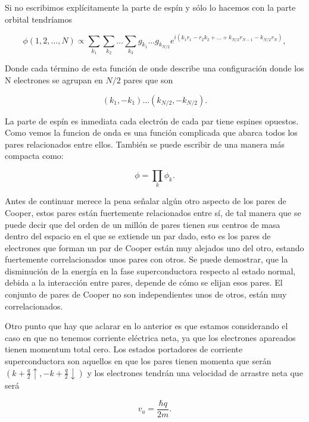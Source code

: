 Si no escribimos explícitamente la parte de espín y sólo lo hacemos con la parte orbital tendríamos

\begin{equation}
    \phi(1,2,...,N) \propto \sum_{k_1} \sum_{k_2} ... \sum_{k_3} g_{k_1} ... g_{k_{N/2}} e^{i (k_1 r_1 - r_2 k_2 + ... + k_{N/2} r_{N-1} - k_{N/2} r_N)} ,
\end{equation}

Donde cada término de esta función de onde describe una configuración donde los N electrones se agrupan en $N/2$ pares que son

\begin{equation}
    (k_1, -k_1) ... (k_{N/2}, -k_{N/2}) .
\end{equation}

La parte de espín es inmediata cada electrón de cada par tiene espines opuestos. Como vemos la funcion de onda es una función complicada que abarca todos los pares relacionados entre ellos. También se puede escribir de una manera más compacta como:

\begin{equation}
    \phi = \prod\limits_k \phi_k .
\end{equation}

Antes de continuar merece la pena señalar algún otro aspecto de los pares de Cooper, estos pares están fuertemente relacionados entre sí, de tal manera que se puede decir que del orden de un millón de pares tienen sus centros de masa dentro del espacio en el que se extiende un par dado, esto es los pares de electrones que forman un par de Cooper están muy alejados uno del otro, estando fuertemente correlacionados unos pares con otros. Se puede demostrar, que la disminución de la energía en la fase superconductora respecto al estado normal, debida a la interacción entre pares, depende de cómo se elijan esos pares. El conjunto de pares de Cooper no son independientes unos de otros, están muy correlacionados.

Otro punto que hay que aclarar en lo anterior es que estamos considerando el caso en que no tenemos corriente eléctrica neta, ya que los electrones apareados tienen momentum total cero. Los estados portadores  de corriente superconductora son aquellos en que los pares tienen momenta que serán $(k + \frac{q}{2} \uparrow, -k + \frac{q}{2} \downarrow)$ y los electrones tendrán una velocidad de arrastre neta que será

\begin{equation}
    v_a = \frac{\hbar q}{2m} .
\end{equation}

